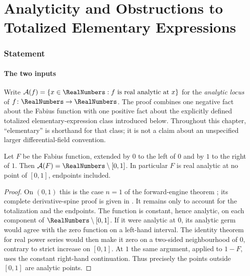 
\part{Analyticity and Obstructions to Totalized Elementary Expressions}


\section{Statement}

\subsection{The two inputs}

Write $\An(f)=\{x\in\RealNumbers : f \text{ is real analytic at } x\}$ for the
\emph{analytic locus} of $f\colon\RealNumbers\to\RealNumbers$.  The proof combines one negative
fact about the Fabius function with one positive fact about the explicitly
defined totalized elementary-expression class introduced below.  Throughout
this chapter, ``elementary'' is shorthand for that class; it is not a claim
about an unspecified larger differential-field convention.

\begin{theorem}\label{ne:thm:nowhere}
Let $F$ be the Fabius function, extended by $0$ to the left of $0$ and by $1$
to the right of $1$.  Then $\An(F)=\RealNumbers\setminus[0,1]$.  In particular $F$ is
real analytic at no point of $[0,1]$, endpoints included.
\end{theorem}

\begin{proof}
On $(0,1)$ this is the case $n=1$ of the forward-engine theorem
; its complete derivative-spine proof is given in
.  It remains only to account for the
totalization and the endpoints.  The function is constant, hence analytic,
on each component of $\RealNumbers\setminus[0,1]$.  If it were analytic at
$0$, its analytic germ would agree with the zero function on a left-hand
interval.  The identity theorem for real power series would then make it zero
on a two-sided neighbourhood of $0$, contrary to strict increase on
$[0,1]$.  At $1$ the same argument, applied to $1-F$, uses the constant
right-hand continuation.  Thus precisely the points outside $[0,1]$ are
analytic points.
\end{proof}

